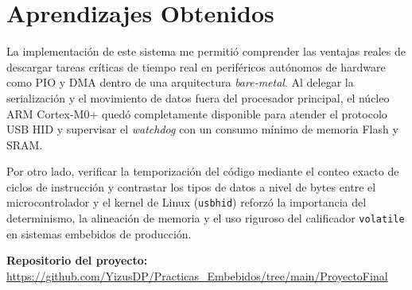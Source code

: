 \documentclass[conference]{IEEEtran}
\begin{document}
\section*{Aprendizajes Obtenidos}

La implementación de este sistema me permitió comprender las ventajas reales de descargar tareas críticas de tiempo real en periféricos autónomos de hardware como PIO y DMA dentro de una arquitectura \textit{bare-metal}. Al delegar la serialización y el movimiento de datos fuera del procesador principal, el núcleo ARM Cortex-M0+ quedó completamente disponible para atender el protocolo USB HID y supervisar el \textit{watchdog} con un consumo mínimo de memoria Flash y SRAM.

Por otro lado, verificar la temporización del código mediante el conteo exacto de ciclos de instrucción y contrastar los tipos de datos a nivel de bytes entre el microcontrolador y el kernel de Linux (\texttt{usbhid}) reforzó la importancia del determinismo, la alineación de memoria y el uso riguroso del calificador \texttt{volatile} en sistemas embebidos de producción.

\vspace{0.3cm}
\noindent\textbf{Repositorio del proyecto:} \\
\url{https://github.com/YizusDP/Practicas_Embebidos/tree/main/ProyectoFinal}
\end{document}
